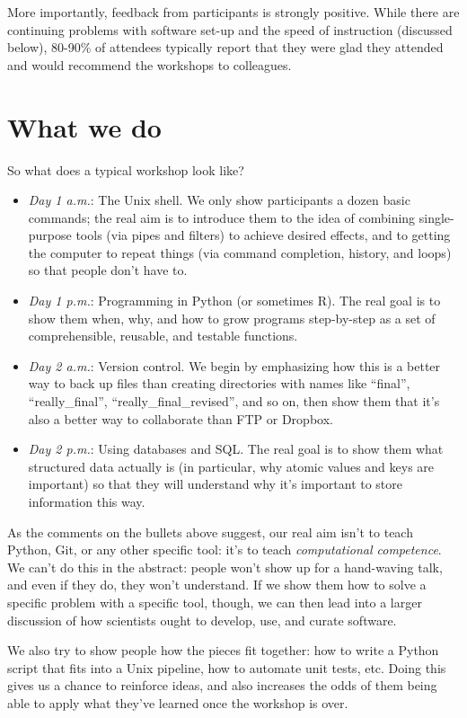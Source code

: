 \documentclass[10pt,a4paper,twocolumn]{article}
\begin{document}
More importantly, feedback from participants is strongly
positive. While there are continuing problems with software set-up and
the speed of instruction (discussed below), 80-90\% of attendees
typically report that they were glad they attended and would recommend
the workshops to colleagues.

\section*{What we do}

So what does a typical workshop look like?

\begin{itemize}
\item
  \emph{Day 1 a.m.}: The Unix shell. We only show participants a dozen
  basic commands; the real aim is to introduce them to the idea of
  combining single-purpose tools (via pipes and filters) to achieve
  desired effects, and to getting the computer to repeat things (via
  command completion, history, and loops) so that people don't have
  to.
\item
  \emph{Day 1 p.m.}: Programming in Python (or sometimes R). The real
  goal is to show them when, why, and how to grow programs
  step-by-step as a set of comprehensible, reusable, and testable
  functions.
\item
  \emph{Day 2 a.m.}: Version control. We begin by emphasizing how this
  is a better way to back up files than creating directories with names
  like ``final'', ``really\_final'', ``really\_final\_revised'', and
  so on, then show them that it's also a better way to collaborate
  than FTP or Dropbox.
\item
  \emph{Day 2 p.m.}: Using databases and SQL.  The real goal is to
  show them what structured data actually is (in particular, why
  atomic values and keys are important) so that they will understand
  why it's important to store information this way.
\end{itemize}

As the comments on the bullets above suggest, our real aim isn't to
teach Python, Git, or any other specific tool: it's to teach
\emph{computational competence}. We can't do this in the abstract:
people won't show up for a hand-waving talk, and even if they do, they
won't understand. If we show them how to solve a specific problem with
a specific tool, though, we can then lead into a larger discussion of
how scientists ought to develop, use, and curate software.

We also try to show people how the pieces fit together: how to write a
Python script that fits into a Unix pipeline, how to automate unit
tests, etc. Doing this gives us a chance to reinforce ideas, and also
increases the odds of them being able to apply what they've learned
once the workshop is over.
\end{document}
